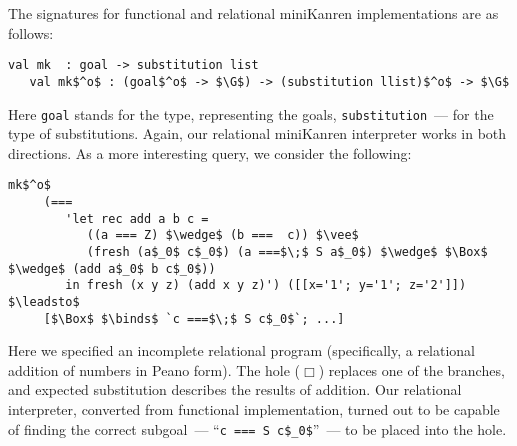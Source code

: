 The signatures for functional and relational miniKanren implementations are as follows:

\begin{lstlisting}[basicstyle=\small]
   val mk  : goal -> substitution list
   val mk$^o$ : (goal$^o$ -> $\G$) -> (substitution llist)$^o$ -> $\G$
\end{lstlisting}

Here \lstinline|goal| stands for the type, representing the goals, \lstinline|substitution|~--- for the type of substitutions. Again, 
our relational miniKanren interpreter works in both directions. As a more interesting query, we consider the following:

\begin{lstlisting}[basicstyle=\small]
   mk$^o$
     (=== 
        'let rec add a b c =
           ((a === Z) $\wedge$ (b ===  c)) $\vee$
           (fresh (a$_0$ c$_0$) (a ===$\;$ S a$_0$) $\wedge$ $\Box$ $\wedge$ (add a$_0$ b c$_0$))
        in fresh (x y z) (add x y z)') ([[x='1'; y='1'; z='2']])  $\leadsto$   
     [$\Box$ $\binds$ `c ===$\;$ S c$_0$`; ...]
\end{lstlisting}

Here we specified an incomplete relational program (specifically, a relational addition of numbers in Peano form). The hole ($\Box$) replaces
one of the branches, and expected substitution describes the results of addition. Our relational interpreter, converted from functional
implementation, turned out to be capable of finding the correct subgoal~--- ``\lstinline|c === S c$_0$|''~--- to be placed into the hole.


